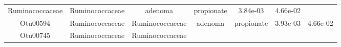 \documentclass[11pt,]{article}
\begin{document}
\begin{longtable}[]{@{}ccccccc@{}}
\begin{minipage}[t]{0.17\columnwidth}
Ruminococcaceae\strut
\end{minipage} & \begin{minipage}[t]{0.17\columnwidth}\centering\strut
Ruminococcaceae\strut
\end{minipage} & \begin{minipage}[t]{0.09\columnwidth}\centering\strut
adenoma\strut
\end{minipage} & \begin{minipage}[t]{0.11\columnwidth}\centering\strut
propionate\strut
\end{minipage} & \begin{minipage}[t]{0.09\columnwidth}\centering\strut
3.84e-03\strut
\end{minipage} & \begin{minipage}[t]{0.09\columnwidth}\centering\strut
4.66e-02\strut
\end{minipage}\tabularnewline
\begin{minipage}[t]{0.09\columnwidth}\centering\strut
Otu00594\strut
\end{minipage} & \begin{minipage}[t]{0.17\columnwidth}\centering\strut
Ruminococcaceae\strut
\end{minipage} & \begin{minipage}[t]{0.17\columnwidth}\centering\strut
Ruminococcaceae\strut
\end{minipage} & \begin{minipage}[t]{0.09\columnwidth}\centering\strut
adenoma\strut
\end{minipage} & \begin{minipage}[t]{0.11\columnwidth}\centering\strut
propionate\strut
\end{minipage} & \begin{minipage}[t]{0.09\columnwidth}\centering\strut
3.93e-03\strut
\end{minipage} & \begin{minipage}[t]{0.09\columnwidth}\centering\strut
4.66e-02\strut
\end{minipage}\tabularnewline
\begin{minipage}[t]{0.09\columnwidth}\centering\strut
Otu00745\strut
\end{minipage} & \begin{minipage}[t]{0.17\columnwidth}\centering\strut
Ruminococcaceae\strut
\end{minipage} & \begin{minipage}[t]{0.17\columnwidth}\centering\strut
Ruminococcaceae\strut
\end{minipage} & \begin{minipage}[t]{0.09\columnwidth}\centering\strut

\end{minipage}
\end{longtable}
\end{document}
